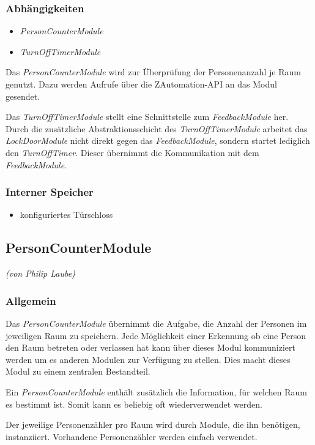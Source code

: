 \subsubsection{Abhängigkeiten}
\begin{itemize}
	\item \emph{PersonCounterModule}
	\item \emph{TurnOffTimerModule}
\end{itemize}
Das \emph{PersonCounterModule} wird zur Überprüfung der Personenanzahl je Raum genutzt. Dazu werden Aufrufe über die ZAutomation-API an das Modul gesendet.

Das \emph{TurnOffTimerModule} stellt eine Schnittstelle zum \emph{FeedbackModule} her. Durch die zusätzliche Abstraktionsschicht des \emph{TurnOffTimerModule} arbeitet das \emph{LockDoorModule} nicht direkt gegen das \emph{FeedbackModule}, sondern startet lediglich den \emph{TurnOffTimer}. Dieser übernimmt die Kommunikation mit dem \emph{FeedbackModule}.

\subsubsection{Interner Speicher}
\begin{itemize}
	\item konfiguriertes Türschloss
\end{itemize}

\newpage
\subsection{PersonCounterModule}
\emph{(von Philip Laube)}
\subsubsection{Allgemein}
Das \emph{PersonCounterModule} übernimmt die Aufgabe, die Anzahl der Personen im jeweiligen Raum zu speichern. Jede Möglichkeit einer Erkennung ob eine Person den Raum betreten oder verlassen hat kann über dieses Modul kommuniziert werden um es anderen Modulen zur Verfügung zu stellen. Dies macht dieses Modul zu einem zentralen Bestandteil.

Ein \emph{PersonCounterModule} enthält zusätzlich die Information, für welchen Raum es bestimmt ist. Somit kann es beliebig oft wiederverwendet werden.

Der jeweilige Personenzähler pro Raum wird durch Module, die ihn benötigen, instanziiert. Vorhandene Personenzähler werden einfach verwendet.

